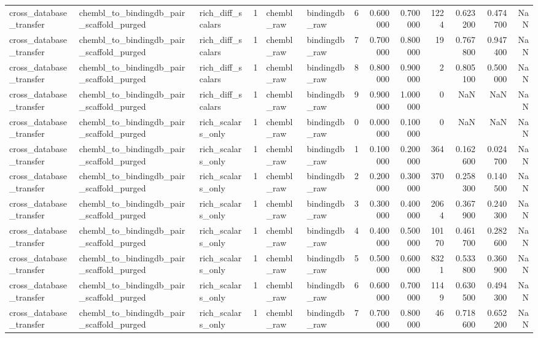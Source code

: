 \begin{longtable}{lllrllrrrrrrr}
cross\_database\_transfer & chembl\_to\_bindingdb\_pair\_scaffold\_purged & rich\_diff\_scalars & 1 & chembl\_raw & bindingdb\_raw & 6 & 0.600000 & 0.700000 & 1224 & 0.623200 & 0.474700 & NaN \\
cross\_database\_transfer & chembl\_to\_bindingdb\_pair\_scaffold\_purged & rich\_diff\_scalars & 1 & chembl\_raw & bindingdb\_raw & 7 & 0.700000 & 0.800000 & 19 & 0.767800 & 0.947400 & NaN \\
cross\_database\_transfer & chembl\_to\_bindingdb\_pair\_scaffold\_purged & rich\_diff\_scalars & 1 & chembl\_raw & bindingdb\_raw & 8 & 0.800000 & 0.900000 & 2 & 0.805100 & 0.500000 & NaN \\
cross\_database\_transfer & chembl\_to\_bindingdb\_pair\_scaffold\_purged & rich\_diff\_scalars & 1 & chembl\_raw & bindingdb\_raw & 9 & 0.900000 & 1.000000 & 0 & NaN & NaN & NaN \\
cross\_database\_transfer & chembl\_to\_bindingdb\_pair\_scaffold\_purged & rich\_scalars\_only & 1 & chembl\_raw & bindingdb\_raw & 0 & 0.000000 & 0.100000 & 0 & NaN & NaN & NaN \\
cross\_database\_transfer & chembl\_to\_bindingdb\_pair\_scaffold\_purged & rich\_scalars\_only & 1 & chembl\_raw & bindingdb\_raw & 1 & 0.100000 & 0.200000 & 364 & 0.162600 & 0.024700 & NaN \\
cross\_database\_transfer & chembl\_to\_bindingdb\_pair\_scaffold\_purged & rich\_scalars\_only & 1 & chembl\_raw & bindingdb\_raw & 2 & 0.200000 & 0.300000 & 370 & 0.258300 & 0.140500 & NaN \\
cross\_database\_transfer & chembl\_to\_bindingdb\_pair\_scaffold\_purged & rich\_scalars\_only & 1 & chembl\_raw & bindingdb\_raw & 3 & 0.300000 & 0.400000 & 2064 & 0.367900 & 0.240300 & NaN \\
cross\_database\_transfer & chembl\_to\_bindingdb\_pair\_scaffold\_purged & rich\_scalars\_only & 1 & chembl\_raw & bindingdb\_raw & 4 & 0.400000 & 0.500000 & 10170 & 0.461700 & 0.282600 & NaN \\
cross\_database\_transfer & chembl\_to\_bindingdb\_pair\_scaffold\_purged & rich\_scalars\_only & 1 & chembl\_raw & bindingdb\_raw & 5 & 0.500000 & 0.600000 & 8321 & 0.533800 & 0.360900 & NaN \\
cross\_database\_transfer & chembl\_to\_bindingdb\_pair\_scaffold\_purged & rich\_scalars\_only & 1 & chembl\_raw & bindingdb\_raw & 6 & 0.600000 & 0.700000 & 1149 & 0.630500 & 0.494300 & NaN \\
cross\_database\_transfer & chembl\_to\_bindingdb\_pair\_scaffold\_purged & rich\_scalars\_only & 1 & chembl\_raw & bindingdb\_raw & 7 & 0.700000 & 0.800000 & 46 & 0.718600 & 0.652200 & NaN \\

\end{longtable}
